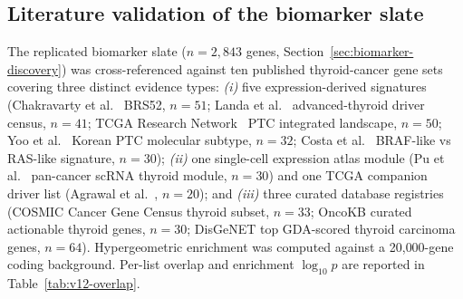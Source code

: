 
\subsection{Literature validation of the biomarker slate}
\label{sec:v12-lit-biomarkers}

The replicated biomarker slate ($n = 2{,}843$ genes, Section~\ref{sec:biomarker-discovery})
was cross-referenced against ten published thyroid-cancer gene sets covering three
distinct evidence types: \emph{(i)} five expression-derived signatures
(Chakravarty et al.~\citeyear{chakravarty2011braf} BRS52, $n=51$;
Landa et al.~\citeyear{landa2016genomic} advanced-thyroid driver census, $n=41$;
TCGA Research Network~\citeyear{tcga2014integrated} PTC integrated landscape, $n=50$;
Yoo et al.~\citeyear{yoo2019integrative} Korean PTC molecular subtype, $n=32$;
Costa et al.~\citeyear{costa2015braf} BRAF-like vs RAS-like signature, $n=30$);
\emph{(ii)} one single-cell expression atlas module
(Pu et al.~\citeyear{pu2021scrna} pan-cancer scRNA thyroid module, $n=30$) and
one TCGA companion driver list (Agrawal et al.~\citeyear{agrawal2014integrated}, $n=20$);
and \emph{(iii)} three curated database registries
(COSMIC Cancer Gene Census thyroid subset, $n=33$;
OncoKB curated actionable thyroid genes, $n=30$;
DisGeNET top GDA-scored thyroid carcinoma genes, $n=64$).
Hypergeometric enrichment was computed against a 20{,}000-gene coding background.
Per-list overlap and enrichment $\log_{10} p$ are reported in Table~\ref{tab:v12-overlap}.

